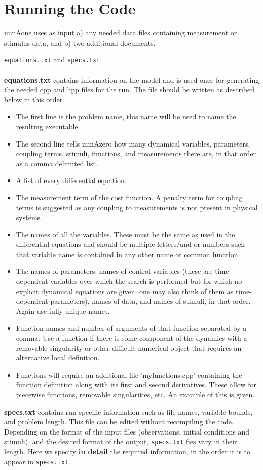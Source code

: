 \documentclass[11pt]{article}
\begin{document}
\section{Running the Code}
minAone uses as input a) any needed data files containing measurement or stimulus data, and b) two additional documents, {\texttt{equations.txt} and \texttt{specs.txt}.  
\\ \\
{\bf equations.txt} contains information on the model and is used once for generating the needed cpp and hpp files for the run.  The file should be written as described below in this order.

\begin{itemize}
\item The first line is the problem name, this name will be used to name the resulting executable.
\item The second line tells minAzero how many dynamical variables, parameters, coupling terms, stimuli, functions, and measurements there are, in that order as a comma delimited list. 

\item A list of every differential equation.

\item The measurement term of the cost function.  A penalty term for coupling terms is suggested as any coupling to measurements is not present in physical systems.

\item The names of all the variables.  These must be the same as used in the differential equations and should be multiple letters/and or numbers such that variable name is contained in any other name or common function.
\item The names of parameters, names of control variables (these are time-dependent variables over which the search is performed but for which no explicit dynamical equations are given; one may also think of them as time-dependent parameters), names of data, and names of stimuli, in that order.  Again use fully unique names.
\item Function names and number of arguments of that function separated by a comma.  Use a function if there is some component of the dynamics with a removable singularity or other difficult numerical object that requires an alternative local definition.
\item Functions will require an additional file 'myfunctions.cpp' containing the function definition along with its first and second derivatives. These allow for piecewise functions, removable singularities, etc. An example of this is given.
\end{itemize}
\bigskip
\pagebreak
{\bf specs.txt} contains run specific information such as file names, variable bounds, and problem length.  This file can be edited without recompiling the code. Depending on the format of the input files (observations, initial conditions and stimuli), and the desired format of the output, \texttt{specs.txt} fies vary in their length. Here we specify {\bf  in detail} the required information, in the order it is to appear in \texttt{specs.txt}.

}
\end{document}
